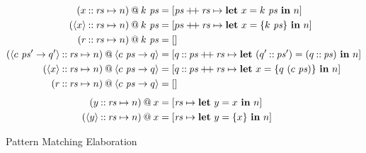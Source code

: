 \documentclass[11pt]{article}
\newcommand{\key}[1]{\textbf{#1}} %
\newcommand{\handleSymbol}{\rightarrow}
\newcommand{\handle}[2]{{#1} \handleSymbol {#2}}
\newcommand{\thunk}[1]{\{{#1}\}}
\newcommand{\effin}[1]{\langle {#1} \rangle}
\begin{document}
\begin{figure*}
\begin{align*}
    (x \cons \rs \mapsto n) \proj k~\ps &=
        [\ps \concat \rs \mapsto \key{let}~x = k~\ps~\key{in}~n] \\
(\effin{x} \cons \rs \mapsto n) \proj k~\ps &= [ps \concat \rs \mapsto
          \key{let}~x = \thunk{k~\ps}~\key{in}~n]\\
     (r \cons \rs \mapsto n) \proj k~\ps &= \emptylist\\
%
%
(\effin{\handle{c~\ps'}{q'}} \cons \rs \mapsto n) \proj \effin{\handle{c~\ps}{q}} &=
  [q \cons \ps \concat \rs \mapsto \key{let}~(q' \cons \ps') = (q \cons \ps)~\key{in}~n] \\
(\effin{x} \cons \rs \mapsto n) \proj \effin{\handle{c~\ps}{q}} &=
  [q \cons \ps \concat \rs \mapsto \key{let}~x = \thunk{q~(c~\ps)}~\key{in}~n] \\
(r \cons \rs \mapsto n) \proj \effin{\handle{c~\ps}{q}} &= \emptylist \\[1ex]
(y \cons \rs \mapsto n) \proj x &= [\rs \mapsto \key{let}~y = x~\key{in}~n] \\
(\effin{y} \cons \rs \mapsto n) \proj x &=
  [\rs \mapsto \key{let}~y = \thunk{x}~\key{in}~n] \\
\end{align*}
\caption{Pattern Matching Elaboration}
\label{fig:pattern-matching-elaboration}
\end{figure*}
\end{document}
